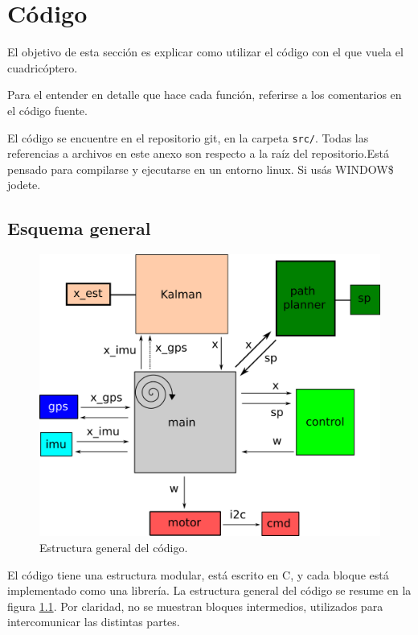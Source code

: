 \documentclass[main]{subfiles}
\begin{document}
\chapter{Código}
\label{chap:codigo}

El objetivo de esta sección es explicar como utilizar el código con el que vuela el cuadricóptero.

Para el entender en detalle que hace cada función, referirse a los comentarios en el código fuente.

El código se encuentre en el repositorio git, en la carpeta \verb+src/+. Todas las referencias a archivos en este anexo son respecto a la raíz del repositorio.Está pensado para compilarse y ejecutarse en un entorno linux. Si usás WINDOW\$ jodete. 

\section{Esquema general}
\label{sec:codigo:esquema-general}

\begin{figure}
\vspace{-20pt}
\centering
  \includegraphics{./pics_codigo/code.png}
\caption{Estructura general del código.}
\vspace{-20pt}
\label{fig:codigo:code.png}
\end{figure}

El código tiene una estructura modular, está escrito en C, y cada bloque está implementado como una librería. La estructura general del código se resume en la figura \ref{fig:codigo:code.png}. Por claridad, no se muestran bloques intermedios, utilizados para intercomunicar las distintas partes.
\end{document}
